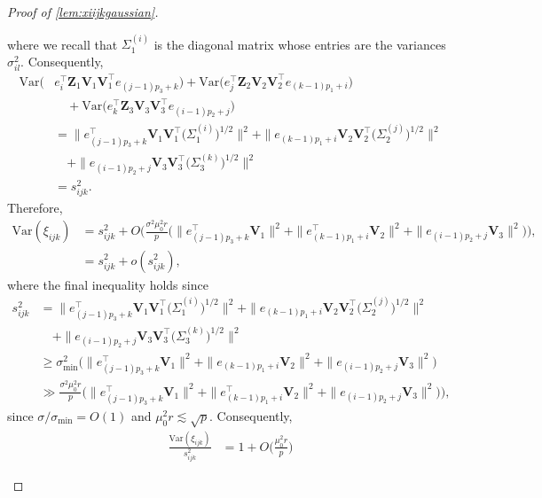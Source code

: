 \documentclass[10pt]{article}
\newcommand{\0}{{\mathbf{0}}}
\newcommand{\1}{{\mathbf{1}}}
\renewcommand{\t}{^{\top}}
\begin{document}
\begin{proof}[Proof of \cref{lem:xiijkgaussian}]
\begin{itemize}
where we recall that $\Sigma^{(i)}_1$ is the diagonal matrix whose entries are the variances $\sigma^2_{il}$.   Consequently,
\begin{align*}
    \mathrm{Var}\bigg( &e_i\t \mathbf{Z}_1 \mathbf{V}_1 \mathbf{V}_1\t e_{(j-1)p_3 + k}\bigg) + \mathrm{Var}\bigg( e_j\t \mathbf{Z}_2 \mathbf{V}_2 \mathbf{V}_2\t e_{(k-1)p_1 + i} \bigg)  \\
    &\quad + \mathrm{Var}\bigg( e_k\t \mathbf{Z}_3 \mathbf{V}_3 \mathbf{V}_3\t e_{(i-1)p_2 + j} \bigg) \\
    &= \| e_{(j-1)p_3 + k}\t \mathbf{V}_1 \mathbf{V}_1\t \big(\Sigma^{(i)}_1\big)^{1/2} \|^2 + \|e_{(k-1)p_1 + i} \mathbf{V}_2 \mathbf{V}_2\t \big(\Sigma^{(j)}_2\big)^{1/2} \|^2 \\
    &\quad + \| e_{(i-1)p_2 + j} \mathbf{V}_3 \mathbf{V}_3\t \big( \Sigma^{(k)}_3\big)^{1/2} \|^2 \\
    &= s_{ijk}^2.
\end{align*}
Therefore,
\begin{align*}
    \mathrm{Var}(\xi_{ijk}) &= s_{ijk}^2 + O\bigg( \frac{\sigma^2\mu_0^2 r}{p} \bigg(  \|e_{(j-1)p_3 + k} \t \mathbf{V}_1 \|^2 + \|e_{(k-1)p_1 + i}\t \mathbf{V}_2 \|^2 + \| e_{(i-1)p_2 + j} \mathbf{V}_3 \|^2 \bigg) \bigg), \\
    &= s^2_{ijk} + o( s^2_{ijk}),
\end{align*}
where the final inequality holds since 
\begin{align*}
    s^2_{ijk} &= \| e_{(j-1)p_3 + k}\t \mathbf{V}_1 \mathbf{V}_1\t \big(\Sigma^{(i)}_1\big)^{1/2} \|^2 + \|e_{(k-1)p_1 + i} \mathbf{V}_2 \mathbf{V}_2\t \big(\Sigma^{(j)}_2\big)^{1/2} \|^2 \\
    &\quad + \| e_{(i-1)p_2 + j} \mathbf{V}_3 \mathbf{V}_3\t \big(\Sigma^{(k)}_3\big)^{1/2} \|^2  \\
    &\geq \sigma_{\min}^2 \bigg( \| e_{(j-1)p_3 + k}\t \mathbf{V}_1  \|^2 + \|e_{(k-1)p_1 + i} \mathbf{V}_2 \|^2 + \| e_{(i-1)p_2 + j} \mathbf{V}_3 \|^2 \bigg) \\
    &\gg \frac{\sigma^2\mu_0^2 r}{p} \bigg(  \|e_{(j-1)p_3 + k} \t \mathbf{V}_1 \|^2 + \|e_{(k-1)p_1 + i}\t \mathbf{V}_2 \|^2 + \| e_{(i-1)p_2 + j} \mathbf{V}_3 \|^2 \bigg) \bigg),
\end{align*}
since $\sigma/\sigma_{\min} = O(1)$ and $\mu_0^2 r \lesssim \sqrt{p}$.  Consequently, 
\begin{align}
    \frac{\mathrm{Var}(\xi_{ijk})}{s^2_{ijk}} &= 1 + O\bigg( \frac{\mu_0^2 r}{p} \bigg) \label{eq:taylor1}
\end{align}

\end{itemize}
\end{proof}
\end{document}
